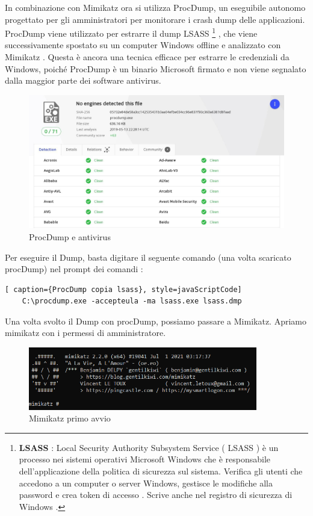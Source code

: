 In combinazione con Mimikatz ora si utilizza ProcDump\cite{ProcDump}, un eseguibile autonomo progettato per gli amministratori per monitorare i crash dump delle applicazioni. ProcDump viene utilizzato per estrarre il dump LSASS \footnote[1]{\textbf{LSASS} : Local Security Authority Subsystem Service ( LSASS ) è un processo nei sistemi operativi Microsoft Windows che è responsabile dell'applicazione della politica di sicurezza sul sistema. Verifica gli utenti che accedono a un computer o server Windows, gestisce le modifiche alla password e crea token di accesso . Scrive anche nel registro di sicurezza di Windows .} , che viene successivamente spostato su un computer Windows offline e analizzato con Mimikatz . Questa è ancora una tecnica efficace per estrarre le credenziali da Windows, poiché ProcDump è un binario Microsoft firmato e non viene segnalato dalla maggior parte dei software antivirus.

\begin{figure}[h!]
    \centering
    \includegraphics[width=120mm]{Immagini/2/procdump.jpg}
    \caption{ProcDump e antivirus}
    \label{fig:ProcDump}
\end{figure}

\newpage

Per eseguire il Dump, basta digitare il seguente comando (una volta scaricato procDump) nel prompt dei comandi :

\begin{lstlisting}[ caption={ProcDump copia lsass}, style=javaScriptCode]
    C:\procdump.exe -accepteula -ma lsass.exe lsass.dmp
\end{lstlisting}

Una volta svolto il Dump con procDump, possiamo passare a Mimikatz. 
Apriamo mimikatz con i permessi di amministratore.
\begin{figure}[h!]
    \centering
    \includegraphics[width=100mm]{Immagini/2/mimikatz_1.PNG}
    \caption{Mimikatz primo avvio}
    \label{fig:ProcDump}
\end{figure}

